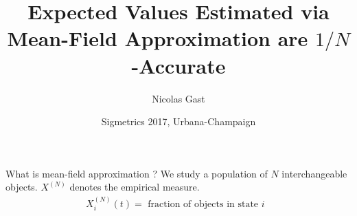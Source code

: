 \documentclass{beamer}
\newcommand\XN{X^{(N)}}
\begin{document}
\title{Expected Values Estimated via Mean-Field Approximation are
  $1/N$-Accurate }%
\author{Nicolas Gast}%
%
\date[Urbana-Champaign, June 2017]{Sigmetrics 2017, Urbana-Champaign }%

\maketitle


\newcommand\newcite[3]{\item[#1] \textbf{#2} -- #3}

\newcommand\object[1]{\node[fill] at (#1) {~};}
\begin{frame}{What is mean-field approximation ?}
  {We study a population of $N$ interchangeable objects. }
  $\XN$ denotes the empirical measure.
  \begin{align*}
    \XN_i(t) = \text{ fraction of objects in state $i$ }
  \end{align*}
  

\end{frame}
\end{document}
